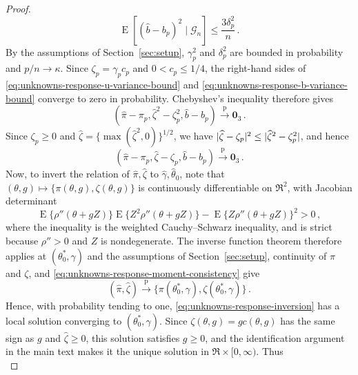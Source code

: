\documentclass{article}
\makeatletter
\DeclareMathOperator{\expect}{E}
\theoremstyle{definition}
\newcommand{\abs}[1]{%
	\ensuremath{%
		\if@display
		\left| #1 \right|
		\else
		\lvert #1 \rvert
		\fi
	}%
}
\newcommand*{\bb}{\boldsymbol}
\makeatother
\begin{document}
\begin{bibunit}
\begin{proof}
\begin{equation}
\label{eq:unknowns-response-b-variance-bound}
    \expect\left[
        (\widehat b-b_p)^2
        \mid
        \mathcal G_n
    \right]
    \leq
    \frac{3\delta_p^2}{n}\,.
\end{equation}
By the assumptions of Section~\ref{sec:setup},
$\gamma_p^2$ and $\delta_p^2$ are bounded in probability and
$p/n\to\kappa$. Since
$
    \zeta_p=\gamma_pc_p
$
and
$
    0<c_p\leq1/4
$,
the right-hand sides of
\eqref{eq:unknowns-response-u-variance-bound} and
\eqref{eq:unknowns-response-b-variance-bound} converge to zero in
probability. Chebyshev's inequality \citep[Corollary~1.2.5]{vershynin:2018} therefore gives 
$$
    (
        \widehat\pi-\pi_p,
        \widehat\zeta^2-\zeta_p^2,
        \widehat b-b_p
    )
    \overset{\mathrm p}{\longrightarrow}
    \bb0_3\,.
$$
Since $\zeta_p\geq0$ and $\widehat\zeta=\{\max(\widehat\zeta^2,0)\}^{1/2}$,
we have
$
    \abs{\widehat\zeta-\zeta_p}^2
    \leq
    \abs{\widehat\zeta^2-\zeta_p^2}
$,
and hence
\begin{equation}
\label{eq:unknowns-response-moment-consistency}
    (
        \widehat\pi-\pi_p,
        \widehat\zeta-\zeta_p,
        \widehat b-b_p
    )
    \overset{\mathrm p}{\longrightarrow}
    \bb0_3\,.
\end{equation}
Now, to invert the relation of $\widehat{\pi}, \widehat{\zeta}$ to $\widehat{\gamma}, \widehat{\theta}_0$, note that 
$(\theta,g)\mapsto\{\pi(\theta,g),\zeta(\theta,g)\}$ is
continuously differentiable on $\Re^2$, with Jacobian determinant
$$
    \expect\{\rho''(\theta+gZ)\}
    \expect\{Z^2\rho''(\theta+gZ)\}
    -
    \expect\{Z\rho''(\theta+gZ)\}^2
    >0\,,
$$
where the inequality is the weighted Cauchy--Schwarz inequality, and is strict
because $\rho''>0$ and $Z$ is nondegenerate.
The inverse function theorem
\citep[Theorem~9.24]{rudin+etal:1976}
therefore applies at $(\theta_0^*,\gamma)$ and the assumptions of Section~\ref{sec:setup}, continuity of $\pi$ and
$\zeta$, and \eqref{eq:unknowns-response-moment-consistency} give
$$
    (\widehat\pi,\widehat\zeta)
    \overset{\mathrm p}{\longrightarrow}
    \{\pi(\theta_0^*,\gamma),\zeta(\theta_0^*,\gamma)\}\,.
$$
Hence, with probability tending to one,
\eqref{eq:unknowns-response-inversion} has a local solution converging to
$(\theta_0^*,\gamma)$. Since
$
    \zeta(\theta,g)=gc(\theta,g)
$
has the same sign as $g$ and $\widehat\zeta\geq0$, this solution satisfies
$g\geq0$, and the identification argument in the main text makes it the
unique solution in $\Re\times[0,\infty)$. Thus
\begin{equation}

\end{equation}
\end{proof}
\end{bibunit}
\end{document}
